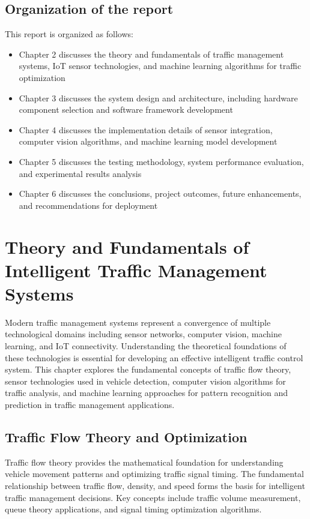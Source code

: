 \documentclass[12pt]{report}
\begin{document}
\section[Organization of the report]{\textbf{Organization of the report}}

This report is organized as follows:
\begin{itemize}
\item Chapter 2 discusses the theory and fundamentals of traffic management systems, IoT sensor technologies, and machine learning algorithms for traffic optimization
\item Chapter 3 discusses the system design and architecture, including hardware component selection and software framework development
\item Chapter 4 discusses the implementation details of sensor integration, computer vision algorithms, and machine learning model development
\item Chapter 5 discusses the testing methodology, system performance evaluation, and experimental results analysis
\item Chapter 6 discusses the conclusions, project outcomes, future enhancements, and recommendations for deployment
\end{itemize}

\chapter{Theory and Fundamentals of Intelligent Traffic Management Systems}
Modern traffic management systems represent a convergence of multiple technological domains including sensor networks, computer vision, machine learning, and IoT connectivity. Understanding the theoretical foundations of these technologies is essential for developing an effective intelligent traffic control system. This chapter explores the fundamental concepts of traffic flow theory, sensor technologies used in vehicle detection, computer vision algorithms for traffic analysis, and machine learning approaches for pattern recognition and prediction in traffic management applications.

\section{Traffic Flow Theory and Optimization}

Traffic flow theory provides the mathematical foundation for understanding vehicle movement patterns and optimizing traffic signal timing. The fundamental relationship between traffic flow, density, and speed forms the basis for intelligent traffic management decisions. Key concepts include traffic volume measurement, queue theory applications, and signal timing optimization algorithms.
\end{document}
